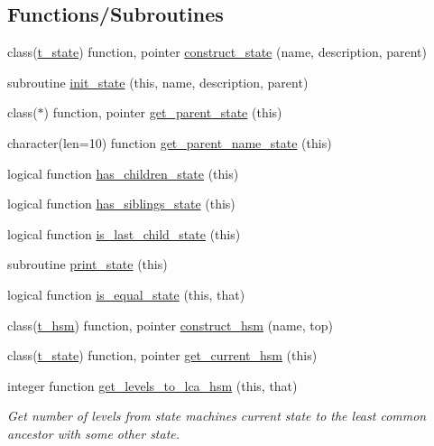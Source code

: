 \subsection*{Functions/\+Subroutines}
\begin{DoxyCompactItemize}
\item 
class(\hyperlink{structmo__hsm__class_1_1t__state}{t\+\_\+state}) function, pointer \hyperlink{namespacemo__hsm__class_a70dc953037835bbb1d4f9546358afc1a}{construct\+\_\+state} (name, description, parent)
\item 
subroutine \hyperlink{namespacemo__hsm__class_adec9511e26e34688b27f77dbf240d1b8}{init\+\_\+state} (this, name, description, parent)
\item 
class($\ast$) function, pointer \hyperlink{namespacemo__hsm__class_aeb0efc21cd23d8e5f25d180b4d6d1732}{get\+\_\+parent\+\_\+state} (this)
\item 
character(len=10) function \hyperlink{namespacemo__hsm__class_a0af75a4141f966bb6120f904adc503b2}{get\+\_\+parent\+\_\+name\+\_\+state} (this)
\item 
logical function \hyperlink{namespacemo__hsm__class_a4192fae85f192ad67ffbc0dad626de15}{has\+\_\+children\+\_\+state} (this)
\item 
logical function \hyperlink{namespacemo__hsm__class_a11c2140f1e1e70b7dad448d6daf2ba83}{has\+\_\+siblings\+\_\+state} (this)
\item 
logical function \hyperlink{namespacemo__hsm__class_adac6a2e8410f3b138009c2c2291847a3}{is\+\_\+last\+\_\+child\+\_\+state} (this)
\item 
subroutine \hyperlink{namespacemo__hsm__class_a3b7ef41ab70fdbb3845f2671817a8299}{print\+\_\+state} (this)
\item 
logical function \hyperlink{namespacemo__hsm__class_a4c53766ff61bbab072f807e110cd597e}{is\+\_\+equal\+\_\+state} (this, that)
\item 
class(\hyperlink{structmo__hsm__class_1_1t__hsm}{t\+\_\+hsm}) function, pointer \hyperlink{namespacemo__hsm__class_a4729d1a17af52e151e4d3780d20b05e6}{construct\+\_\+hsm} (name, top)
\item 
class(\hyperlink{structmo__hsm__class_1_1t__state}{t\+\_\+state}) function, pointer \hyperlink{namespacemo__hsm__class_a72876473c90113f0d9df43a64308c97a}{get\+\_\+current\+\_\+hsm} (this)
\item 
integer function \hyperlink{namespacemo__hsm__class_a7a3a363368c4697a4f4b6c2e76b67be1}{get\+\_\+levels\+\_\+to\+\_\+lca\+\_\+hsm} (this, that)
\begin{DoxyCompactList}\small\item\em Get number of levels from state machines current state to the least common ancestor with some other state. \end{DoxyCompactList}\end{DoxyCompactItemize}
